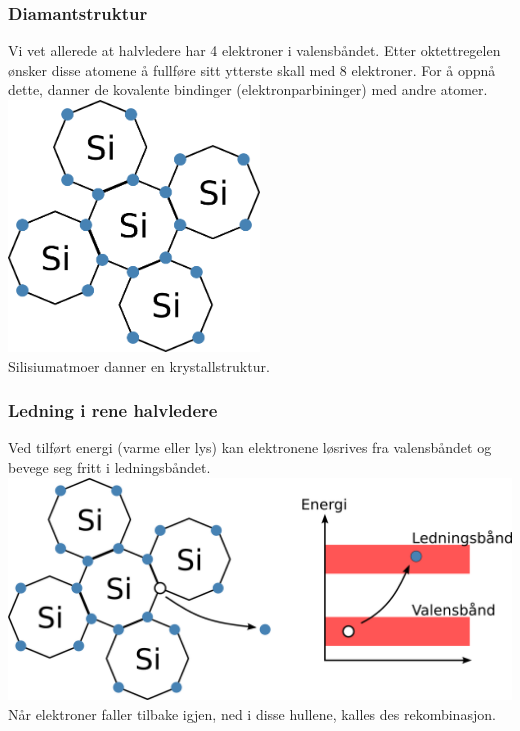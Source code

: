 \subsubsection{Diamantstruktur}
Vi vet allerede at halvledere har 4 elektroner i valensbåndet.
Etter oktettregelen ønsker disse atomene
å fullføre sitt ytterste skall med 8 elektroner.
For å oppnå dette, danner de kovalente bindinger (elektronparbininger)
med andre atomer.
\\
\includegraphics[width=0.5\textwidth]{./img/krystall.png}
\\
Silisiumatmoer danner en krystallstruktur.

\subsubsection{Ledning i rene halvledere}
Ved tilført energi (varme eller lys) kan elektronene løsrives
fra valensbåndet og bevege seg fritt i ledningsbåndet.
\\
\includegraphics[width=\textwidth]{./img/krystall-ledning.png}
\\
Når elektroner faller tilbake igjen, ned i disse hullene,
kalles des rekombinasjon.
